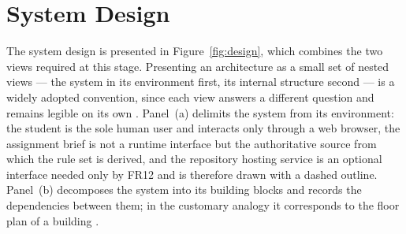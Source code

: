 \documentclass[a4paper,11pt]{article}
\begin{document}
\section{System Design}\label{sec:design}

The system design is presented in Figure~\ref{fig:design}, which combines the two
views required at this stage. Presenting an architecture as a small set of
nested views --- the system in its environment first, its internal structure
second --- is a widely adopted convention, since each view answers a different
question and remains legible on its own \citep{Brown2024}. Panel~(a) delimits
the system from its environment:
the student is the sole human user and interacts only through a web browser, the
assignment brief is not a runtime interface but the authoritative source from
which the rule set is derived, and the repository hosting service is an optional
interface needed only by FR12 and is therefore drawn with a dashed outline.
Panel~(b) decomposes the system into its building blocks and records the
dependencies between them; in the customary analogy it corresponds to the floor
plan of a building \citep{Bass2021}.
\end{document}
